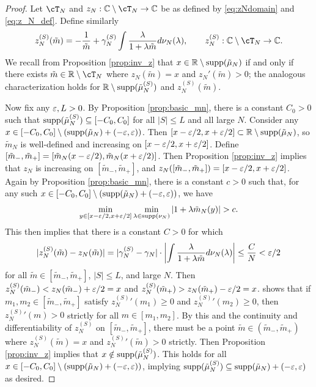 \begin{proof}
Let $\cT_N$ and $z_N:\C \setminus \cT_N \to \C$ be as defined by
\eqref{eq:zNdomain} and \eqref{eq:z_N_def}. Define similarly
\[z_N^{(S)}(\tilde m)=-\frac{1}{\tilde m}+\gamma_N^{(S)}
\int \frac{\lambda}{1+\lambda \tilde m}d\nu_N(\lambda), \qquad
z_N^{(S)}:\C \setminus \cT_N \to \C.\]
We recall from Proposition \ref{prop:inv_z} that
$x \in \mathbb{R} \setminus \mathrm{supp}({\tilde\mu_N})$ if and only if there exists
$\tilde m \in \R \setminus \cT_N$ where $z_N(\tilde m)=x$ and
$z_N'(\tilde m)>0$; the analogous characterization holds for
$\mathbb{R} \setminus \mathrm{supp}({\tilde \mu_N^{(S)}})$ and $z_N^{(S)}(\tilde m)$.

Now fix any $\varepsilon,L>0$. By Proposition \ref{prop:basic_mn}, there is a constant
$C_0>0$ such that $\mathrm{supp}({\tilde \mu_N^{(S)}}) \subseteq [-C_0,C_0]$ for all $|S|
\leq L$ and all large $N$. Consider any $x \in [-C_0,C_0] \setminus
(\mathrm{supp}({\tilde \mu_N})+(-\varepsilon,\varepsilon))$. Then $[x-\varepsilon/2,x+\varepsilon/2] \subset \mathbb{R}
\setminus \mathrm{supp}({\tilde \mu_N})$, so $\tilde m_N$ is well-defined and increasing on
$[x-\varepsilon/2,x+\varepsilon/2]$.
Define $[\tilde m_-,\tilde m_+]=[\tilde m_N(x-\varepsilon/2), \tilde m_N(x+\varepsilon/2)]$.
Then Proposition \ref{prop:inv_z} implies that $z_N$ is increasing on
$[\tilde m_-,\tilde m_+]$, and $z_N([\tilde m_-,\tilde m_+])=[x-\varepsilon/2,x+\varepsilon/2]$.
Again by Proposition \ref{prop:basic_mn}, there is a constant $c>0$ such that,
for any such $x \in [-C_0,C_0] \setminus (\mathrm{supp}({\tilde \mu_N})+(-\varepsilon,\varepsilon))$, we
have
\[\min_{y \in [x-\eps/2,x+\eps/2]} \min_{\lambda \in
\supp{\nu_N}} |1+\lambda \tilde m_N(y)|>c.\]
This then implies that there is a constant $C>0$ for which
\[|z_N^{(S)}(\tilde m)-z_N(\tilde m)|
=|\gamma_N^{(S)}-\gamma_N| \cdot \left|\int \frac{\lambda}{1+\lambda \tilde
m}d\nu_N(\lambda)\right| \leq \frac{C}{N}<\eps/2\]
for all $\tilde m \in [\tilde m_-,\tilde m_+]$,
$|S| \leq L$, and large $N$. Then $z_N^{(S)}(\tilde m_-)<z_N(\tilde m_-)+\varepsilon/2=x$
and $z_N^{(S)}(\tilde m_+)>z_N(\tilde m_+)-\varepsilon/2=x$.
\cite[Theorem 4.3]{silverstein1995analysis} shows that if
$m_1,m_2 \in [\tilde m_-,\tilde m_+]$ satisfy ${z_N^{(S)}}'(m_1) \geq 0$ and
${z_N^{(S)}}'(m_2) \geq 0$, then ${z_N^{(S)}}'(m)>0$ strictly for all $m \in
[m_1,m_2]$. By this and the continuity and differentiability of
$z_N^{(S)}$ on $[\tilde m_-,\tilde m_+]$, there must be a point $\tilde m \in (\tilde
m_-,\tilde m_+)$ where $z_N^{(S)}(\tilde m)=x$ and ${z_N^{(S)}}'(\tilde m)>0$
strictly. Then Proposition \ref{prop:inv_z} implies that
$x \notin \mathrm{supp}({\tilde \mu_N^{(S)}})$. This holds for all
$x \in [-C_0,C_0] \setminus (\mathrm{supp}({\tilde \mu_N})+(-\varepsilon,\varepsilon))$, implying
$\mathrm{supp}({\tilde \mu_N^{(S)}}) \subseteq \mathrm{supp}({\tilde \mu_N})+(-\varepsilon,\varepsilon)$ as desired.
\end{proof}

